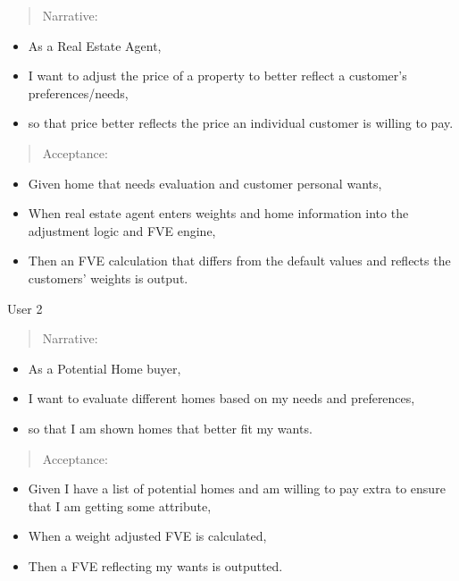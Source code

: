 \begin{quote}
Narrative:
\end{quote}

\begin{itemize}
\item
  As a Real Estate Agent,
\item
  I want to adjust the price of a property to better reflect a
  customer's preferences/needs,
\item
  so that price better reflects the price an individual customer is
  willing to pay.
\end{itemize}

\begin{quote}
Acceptance:
\end{quote}

\begin{itemize}
\item
  Given home that needs evaluation and customer personal wants,
\item
  When real estate agent enters weights and home information into the
  adjustment logic and FVE engine,
\item
  Then an FVE calculation that differs from the default values and
  reflects the customers' weights is output.
\end{itemize}

User 2

\begin{quote}
Narrative:
\end{quote}

\begin{itemize}
\item
  As a Potential Home buyer,
\item
  I want to evaluate different homes based on my needs and preferences,
\item
  so that I am shown homes that better fit my wants.
\end{itemize}

\begin{quote}
Acceptance:
\end{quote}

\begin{itemize}
\item
  Given I have a list of potential homes and am willing to pay extra to
  ensure that I am getting some attribute,
\item
  When a weight adjusted FVE is calculated,
\item
  Then a FVE reflecting my wants is outputted.
\end{itemize}

